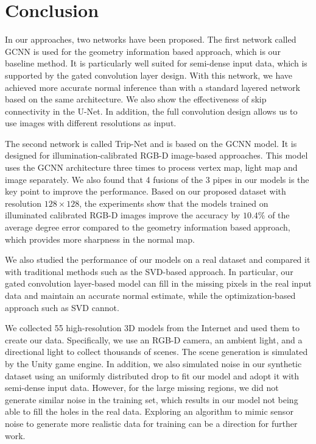 
\chapter{Conclusion} %

\label{ch:06} %


In our approaches, two networks have been proposed. The first network called GCNN is used for the geometry information based approach, which is our baseline method. It is particularly well suited for semi-dense input data, which is supported by the gated convolution layer design.  With this network, we have achieved more accurate normal inference than with a standard layered network based on the same architecture. We also show the effectiveness of skip connectivity in the U-Net. In addition, the full convolution design allows us to use images with different resolutions as input. 

The second network is called Trip-Net and is based on the GCNN model. It is designed for illumination-calibrated RGB-D image-based approaches. This model uses the GCNN architecture three times to process vertex map, light map and image separately. We also found that 4 fusions of the 3 pipes in our models is the key point to improve the performance.
Based on our proposed dataset with resolution $ 128\times 128 $, the experiments show that the models trained on illuminated calibrated RGB-D images improve the accuracy by $ 10.4\% $ of the average degree error compared to the geometry information based approach, which provides more sharpness in the normal map.


We also studied the performance of our models on a real dataset and compared it with traditional methods such as the SVD-based approach. In particular, our gated convolution layer-based model can fill in the missing pixels in the real input data and maintain an accurate normal estimate, while the optimization-based approach such as SVD cannot. 


We collected 55 high-resolution 3D models from the Internet and used them to create our data. Specifically, we use an RGB-D camera, an ambient light, and a directional light to collect thousands of scenes. The scene generation is simulated by the Unity game engine. In addition, we also simulated noise in our synthetic dataset using an uniformly distributed drop to fit our model and adopt it with semi-dense input data.
However, for the large missing regions, we did not generate similar noise in the training set, which results in our model not being able to fill the holes in the real data. Exploring an algorithm to mimic sensor noise to generate more realistic data for training can be a direction for further work.
